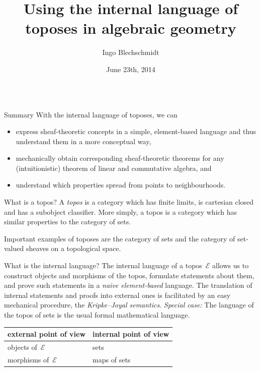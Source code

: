 \documentclass[table]{beamer}
\title{Using the internal language of toposes in algebraic geometry}
\author{Ingo Blechschmidt}
\institute{University of Augsburg}
\date{June 23th, 2014}
\newcommand{\E}{\mathcal{E}}
\begin{document}
\begin{frame}[t]\begin{columns}[t]

\begin{column}{0.3\textwidth}
  \begin{alertblock}{Summary}
    With the internal language of toposes, we can
    \begin{itemize}\justifying
    \item express sheaf-theoretic
    concepts in a simple, ele\-ment-ba\-sed language and thus understand them
    in a more conceptual way,
    \item mechanically obtain
    corresponding sheaf-theo\-re\-tic theorems for any (intuitionistic) theorem of
    linear and commutative algebra, and
    \item understand which properties spread from
    points to neighbourhoods.
    \end{itemize}
  \end{alertblock}
  \bigskip

  \begin{block}{What is a topos?}
    A \emph{topos} is a category which has finite limits, is cartesian closed and
    has a subobject classifier. More simply, a topos is a category which has
    similar properties to the category of sets.\medskip

    Important examples of toposes are
    the category of sets and
    the category of set-valued sheaves on a topological space.
  \end{block}
  \bigskip

  \begin{block}{What is the internal language?}
    The internal language of a topos~$\E$ allows us to
    construct objects and morphisms of the topos,
    formulate statements about them, and
    prove such statements
    in a \emph{naive element-based} language.
    The translation of internal statements and proofs into external ones is
    facilitated by an easy mechanical procedure, the \emph{Kripke--Joyal
    semantics}.
    \emph{Special case:} The language of the topos of sets is the usual
    formal mathematical language.

    \begin{center}
      \begin{tabular}{ll}
        \toprule
        external point of view & internal point of view \\
        \midrule
        objects of~$\E$ & sets \\
        morphisms of~$\E$ & maps of sets \\
        \bottomrule
      \end{tabular}
    \end{center}
  \end{block}


\end{column}
\end{columns}
\end{frame}
\end{document}
